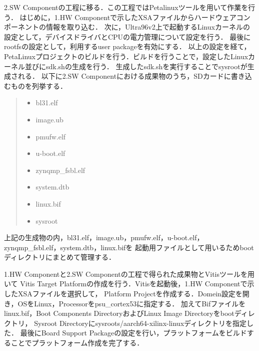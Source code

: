 \documentclass[11pt,a4j]{jreport}
\begin{document}
2.SW Componentの工程に移る．この工程ではPetalinuxツールを用いて作業を行う．
はじめに，1.HW Componentで示したXSAファイルからハードウェアコンポーネントの情報を取り込む．
次に，Ultra96v2上で起動するLinuxカーネルの設定として，デバイスドライバとCPUの電力管理について設定を行う．
最後にrootfsの設定として，利用するuser packageを有効にする．
以上の設定を経て，PetaLinuxプロジェクトのビルドを行う．ビルドを行うことで，設定したLinuxカーネル並びにsdk.shの生成を行う．
生成したsdk.shを実行することでsysrootが生成される．
以下に2.SW Componentにおける成果物のうち，SDカードに書き込むものを列挙する．
\begin{quote}
  \begin{itemize}
    \item bl31.elf
    \item image.ub
    \item pmufw.elf
    \item u-boot.elf
    \item zynqmp_fsbl.elf
    \item system.dtb
    \item linux.bif
    \item sysroot
  \end{itemize}
\end{quote}
上記の生成物の内，bl31.elf，image.ub，pmufw.elf，u-boot.elf，zynqmp_fsbl.elf，system.dtb，linux.bifを
起動用ファイルとして用いるためbootディレクトリにまとめて管理する．

1.HW Componentと2.SW Componentの工程で得られた成果物とVitisツールを用いて
Vitis Target Platformの作成を行う．Vitisを起動後，1.HW Componentで示したXSAファイルを選択して，
Platform Projectを作成する．Domein設定を開き，OSをLinux，Processorをpsu_cortex53に指定する．
加えてBifファイルをlinux.bif，Boot Components DirectoryおよびLinux Image Directoryをbootディレクトリ，
Sysroot Directoryにsysroots/aarch64-xilinx-linuxディレクトリを指定した．
最後にBoard Support Packageの設定を行い，プラットフォームをビルドすることでプラットフォーム作成を完了する．
\end{document}
